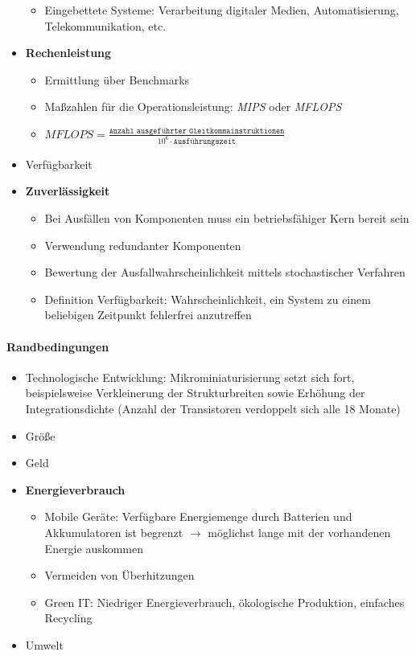 \begin{itemize}
\begin{itemize}
				\item Eingebettete Systeme: Verarbeitung digitaler Medien, Automatisierung, Telekommunikation, etc.
			\end{itemize}
			\item \textbf{Rechenleistung}
			\begin{itemize}
				\item Ermittlung über Benchmarks
				\item Maßzahlen für die Operationsleistung: \textit{MIPS} oder \textit{MFLOPS}
				\item \(MFLOPS = \frac{\texttt{Anzahl ausgeführter Gleitkommainstruktionen}}{10^6 \cdot \texttt{Ausführungszeit}}\)
			\end{itemize}
			\item Verfügbarkeit
			\item \textbf{Zuverlässigkeit}
			\begin{itemize}
				\item Bei Ausfällen von Komponenten muss ein betriebsfähiger Kern bereit sein
				\item Verwendung redundanter Komponenten
				\item Bewertung der Ausfallwahrscheinlichkeit mittels stochastischer Verfahren
				\item Definition Verfügbarkeit: Wahrscheinlichkeit, ein System zu einem beliebigen Zeitpunkt fehlerfrei anzutreffen
			\end{itemize}
		\end{itemize}

	\paragraph{Randbedingungen}
		\begin{itemize}
			\item Technologische Entwicklung: Mikrominiaturisierung setzt sich fort, beispielsweise Verkleinerung der Strukturbreiten sowie Erhöhung der Integrationsdichte (Anzahl der Transistoren verdoppelt sich alle 18 Monate)
			\item Größe
			\item Geld
			\item \textbf{Energieverbrauch}
			\begin{itemize}
				\item Mobile Geräte: Verfügbare Energiemenge durch Batterien und Akkumulatoren ist begrenzt \(\rightarrow\) möglichst lange mit der vorhandenen Energie auskommen
				\item Vermeiden von Überhitzungen
				\item Green IT: Niedriger Energieverbrauch, ökologische Produktion, einfaches Recycling
			\end{itemize}
			\item Umwelt
		\end{itemize}

